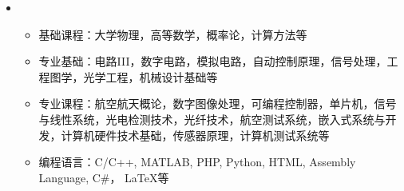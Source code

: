 \reslheading{{\color{white}{ 教育经历}} }
  \begin{itemize}[leftmargin=*]
    \item
      {\small
     
     
      \begin{itemize}
        \item{基础课程：大学物理，高等数学，概率论，计算方法等}
      \end{itemize} 
       \begin{itemize}
        \item{专业基础：电路III，数字电路，模拟电路，自动控制原理，信号处理，工程图学，光学工程，机械设计基础等}
      \end{itemize}
      

       \begin{itemize}
        \item{专业课程：航空航天概论，数字图像处理，可编程控制器，单片机，信号与线性系统，光电检测技术，光纤技术，航空测试系统，嵌入式系统与开发，计算机硬件技术基础，传感器原理，计算机测试系统等}
      \end{itemize}
     
      
       \begin{itemize}
        \item{编程语言：C/C++, MATLAB, PHP, Python, HTML, Assembly  Language, C\#， \LaTeX 等}
      \end{itemize}
            }
            

  \end{itemize}